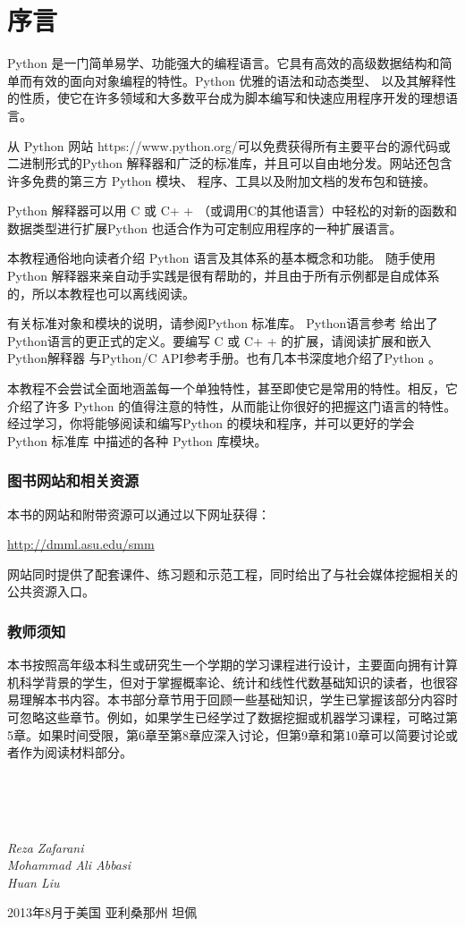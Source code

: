 \chapter*{序言}

Python 是一门简单易学、功能强大的编程语言。它具有高效的高级数据结构和简单而有效的面向对象编程的特性。Python 优雅的语法和动态类型、 以及其解释性的性质，使它在许多领域和大多数平台成为脚本编写和快速应用程序开发的理想语言。

从 Python 网站 https://www.python.org/可以免费获得所有主要平台的源代码或二进制形式的Python 解释器和广泛的标准库，并且可以自由地分发。网站还包含许多免费的第三方 Python 模块、 程序、工具以及附加文档的发布包和链接。

Python 解释器可以用 C 或 C+ +  （或调用C的其他语言）中轻松的对新的函数和数据类型进行扩展Python 也适合作为可定制应用程序的一种扩展语言。

本教程通俗地向读者介绍 Python 语言及其体系的基本概念和功能。 随手使用Python 解释器来亲自动手实践是很有帮助的，并且由于所有示例都是自成体系的，所以本教程也可以离线阅读。

有关标准对象和模块的说明，请参阅Python 标准库。 Python语言参考 给出了Python语言的更正式的定义。要编写 C 或 C+ + 的扩展，请阅读扩展和嵌入Python解释器 与Python/C API参考手册。也有几本书深度地介绍了Python 。

本教程不会尝试全面地涵盖每一个单独特性，甚至即使它是常用的特性。相反，它介绍了许多 Python 的值得注意的特性，从而能让你很好的把握这门语言的特性。经过学习，你将能够阅读和编写Python 的模块和程序，并可以更好的学会 Python 标准库 中描述的各种 Python 库模块。


\subsection*{图书网站和相关资源}

本书的网站和附带资源可以通过以下网址获得：

\url{http://dmml.asu.edu/smm}

网站同时提供了配套课件、练习题和示范工程，同时给出了与社会媒体挖掘相关的公共资源入口。

\subsection*{教师须知}

本书按照高年级本科生或研究生一个学期的学习课程进行设计，主要面向拥有计算机科学背景的学生，但对于掌握概率论、统计和线性代数基础知识的读者，也很容易理解本书内容。本书部分章节用于回顾一些基础知识，学生已掌握该部分内容时可忽略这些章节。例如，如果学生已经学过了数据挖掘或机器学习课程，可略过第5章。如果时间受限，第6章至第8章应深入讨论，但第9章和第10章可以简要讨论或者作为阅读材料部分。

~\\
~\\
~\\

\begin{flushright}
\emph{
	Reza Zafarani \\
	Mohammad Ali Abbasi \\
	Huan Liu
}

2013年8月于美国 亚利桑那州 坦佩
\end{flushright}





